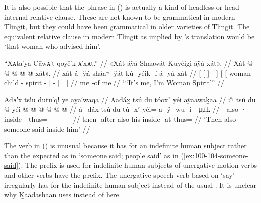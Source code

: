 It is also possible that the phrase  in (\lastx) is actually a kind of headless or head-internal relative clause.
These are not known to be grammatical in modern Tlingit, but they could have been grammatical in older varieties of Tlingit.
The equivalent relative clause in modern Tlingit as implied by \citeauthor{swanton:1909}’s translation would be  ‘that woman who advised him’.

\ex\label{ex:100-158-woman-who-advised}%
%
\begingl
	\glpreamble	“Xᴀta′ỵa Cāwᴀ′t-qoyē′k ᴀ′xᴀt.” //
	\glpreamble	«\!X̱át áÿá Shaawát Ḵuyéigi áÿá x̱át\!». //
	\gla	{} {} X̱át {}  @ {} {} 
		{} {}  @ {}  @ {} @ {} {}
			 @ {}
			{} x̱át\!». {} {} //
	\glb	{} {} x̱át {} á -ÿá {}
		{} {} sháaʷ- ÿát ḵú- yéik -í {} 
			á -yá
			{} x̱át {} {} //
	\glc	{}[ {}[  {}]  - {}]
		{}[ {}[ woman- child - spirit - {}]
			 -
			{}[  {}] {}] //
	\gld	{} {} me {}  {} {} 
		{} {}  {}  {} -of {} 
			 {} 
			{} me {} {} //
	\glft	‘“It’s me, I’m Woman Spirit”.’
		//
\endgl
\xe

\ex\label{ex:100-159-someone-inside-him-spoke}%
%
\begingl
	\glpreamble	Adᴀ′x ts!u dutū′q! ye aỵā′waqa //
	\glpreamble	Aadáx̱ tsú du tóoxʼ yéi aÿaawaḵaa //
	\gla	{}  @ {} {} tsú 
		{} du  @ {} {} 
		yéi @  @ {} @ {} @ {} @ {} @ {} //
	\glb	{} á -dáx̱ {} tsú
		{} du tú -xʼ {}
		yéi= a- ÿ- wu- i-  -μμL //
	\glc	{}  - {} also
		{} · inside - {}
		thus= - - - -  - //
	\gld	{} then -after {} also
		{} his inside -at {} 
		thus=  {} {} {} {} {} //
	\glft	‘Then also someone said inside him’
		//
\endgl
\xe

The verb  in (\lastx) is unusual because it has  for an indefinite human subject rather than the expected  as in  ‘someone said; people said’ as in (\ref{ex:100-104-someone-said}).
The  prefix is used for indefinite human subjects of unergative motion verbs and other verbs have the  prefix.
The unergative speech verb based on  ‘say’ irregularly has  for the indefinite human subject instead of the usual .
It is unclear why Ḵaadashaan uses  instead of  here.

